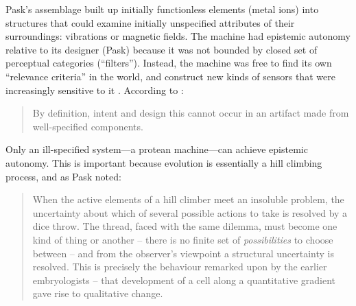 

Pask's assemblage built up initially functionless elements (metal ions) into structures
that could examine
initially unspecified attributes of their surroundings: vibrations or magnetic fields.
The machine had epistemic autonomy
relative to its designer (Pask) because it was
not bounded by
closed set of perceptual categories (``filters'').
Instead,
the machine was free to 
find its own ``relevance criteria'' in the world,
and
construct new kinds of sensors that were increasingly sensitive to it \cite{cariani1993evolve}.
According to \citet{pask1961approach}:
%
\begin{quote}
\small
By definition, intent and design this cannot occur in an artifact made from well-specified components. 
\end{quote}
%
Only an ill-specified system---a protean machine---can achieve epistemic autonomy.
This is important because 
evolution is essentially a hill climbing process, and as
Pask noted:
%
\begin{quote}
\small
When the active elements of a hill climber meet an insoluble
problem, the uncertainty about which of several possible actions
to take is resolved by a dice throw. 
The thread, faced with the same dilemma, must become one kind of thing or another -- there
is no finite set of \textit{possibilities} to choose between %
-- and from the observer's viewpoint a structural uncertainty is resolved. 
This is precisely the behaviour remarked upon by the earlier embryologists -- that development of a cell along a quantitative gradient gave rise to qualitative change.
\end{quote}



